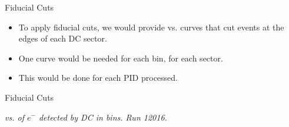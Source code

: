 \begin{frame}{Fiducial Cuts}
    \label{20.05::fiducial_cuts}

    \vspace{48pt}

    \begin{itemize}
        \item
            To apply fiducial cuts, we would provide \ef{$\phi$} vs. \ef{$\theta$} curves that cut events at the edges of each DC sector.

        \vspace{18pt}
        \item
            One curve would be needed for each  bin, for each sector.

        \vspace{18pt}
        \item
            This would be done for each PID processed.
    \end{itemize}

\end{frame}

\begin{frame}{Fiducial Cuts}
    \begin{center}
        \begin{figure}[t]
        \end{figure}
        \scriptsize{\textit{
            \ef{$\phi$} vs. \ef{$\theta$} of $e^-$ detected by DC in  bins. Run 12016.
        }}
    \end{center}

\end{frame}
